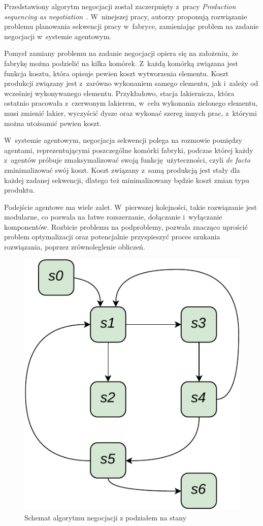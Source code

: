 Przedstawiony algorytm negocjacji został zaczerpnięty z~pracy \emph{Production sequencing as negotiation}~\cite{wooldridge1996production}. W~ninejszej pracy, autorzy proponują rozwiązanie problemu planowania sekwencji pracy w~fabryce, zamieniając problem na zadanie negocjacji w~systemie agentowym.

Pomysł zamiany problemu na zadanie negocjacji opiera się na założeniu, że fabrykę można podzielić na kilka komórek. Z~każdą komórką związana jest funkcja kosztu, która opisuje pewien koszt wytworzenia elementu. Koszt produkcji związany jest z~zarówno wykonaniem samego elementu, jak i~zależy od wcześniej wykonywanego elementu. Przykładowo, stacja lakiernicza, która ostatnio pracowała z~czerwonym lakierem, w~celu wykonania zielonego elementu, musi zmienić lakier, wyczyścić dysze oraz wykonać szereg innych prac, z~którymi można utożsamić pewien koszt.

W~systemie agentowym, negocjacja sekwencji polega na rozmowie pomiędzy agentami, reprezentującymi poszczególne komórki fabryki, podczas której każdy z~agentów próbuje zmaksymalizować swoją funkcję użyteczności, czyli \emph{de facto} zminimalizować swój koszt. Koszt związany z~samą produkcją jest stały dla każdej zadanej sekwencji, dlatego też minimalizowany będzie koszt zmian typu produktu.

Podejście agentowe ma wiele zalet. W~pierwszej kolejności, takie rozwiązanie jest modularne, co pozwala na łatwe rozszerzanie, dołączanie i~wyłączanie komponentów. Rozbicie problemu na podproblemy, pozwala znacząco uprościć problem optymalizacji oraz potencjalnie przyspieszyć proces szukania rozwiązania, poprzez zrównoleglenie obliczeń.

\begin{figure}
    \centering
    \includegraphics[width=0.8\columnwidth]{figures/SAG-Negotiation.pdf}
    \caption{Schemat algorytmu negocjacji z podziałem na stany}
    \label{fig:abstract-negotiation-fsm}
\end{figure}

